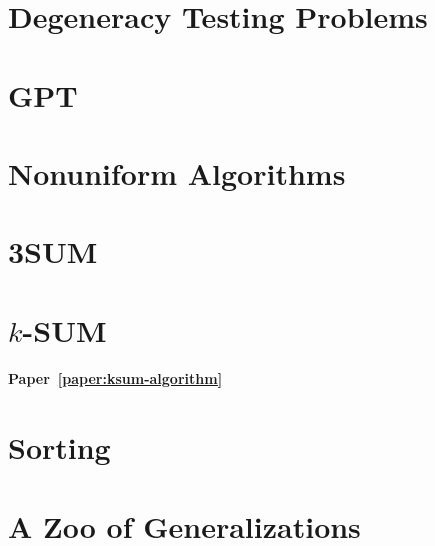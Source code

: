 \section*{Degeneracy Testing Problems}


\section*{GPT}


\section*{Nonuniform Algorithms}


\section*{3SUM}


\section*{\(k\)-SUM}

\paragraph{Paper~\ref{paper:ksum-algorithm}}


\section*{Sorting}


\section*{A Zoo of Generalizations}





